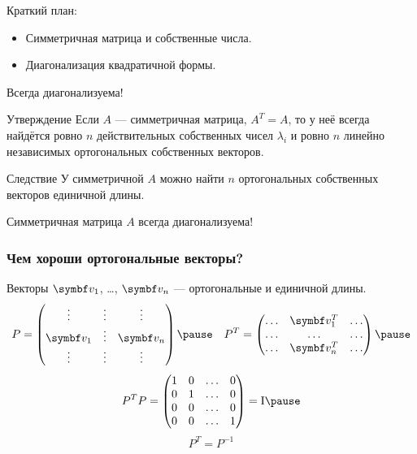 
\begin{frame} %


\end{frame}



\begin{frame}{Краткий план:}
  \begin{itemize}[<+->]
    \item Симметричная матрица и собственные числа.
    \item Диагонализация квадратичной формы.
  \end{itemize}

\end{frame}


\begin{frame}{Всегда диагонализуема!}
    \begin{block}{Утверждение}
        Если $A$ — симметричная матрица, $A^T = A$, то у неё всегда найдётся
        ровно $n$ \alert{действительных} собственных чисел $\lambda_i$ \pause 
        и ровно $n$ линейно независимых \alert{ортогональных} собственных векторов.
    \end{block}
    \pause
    \begin{block}{Следствие}
        У симметричной $A$ можно найти $n$ ортогональных собственных векторов единичной длины.

        Симметричная матрица $A$ всегда диагонализуема!
    \end{block}
\end{frame}    


\begin{frame}
    \frametitle{Чем хороши ортогональные векторы?}

    Векторы $\bv_1$, \ldots, $\bv_n$ — ортогональные и единичной длины.
    \[
    P = \begin{pmatrix}
        \vdots & \vdots & \vdots \\
        \bv_1 & \vdots & \bv_n \\
        \vdots & \vdots & \vdots \\
    \end{pmatrix}    \pause \quad
    P^T = \begin{pmatrix}
        \ldots & \bv_1^T & \ldots \\
    \ldots & \ldots & \ldots \\
    \ldots & \bv_n^T & \ldots \\
    \end{pmatrix}    \pause
    \]
%
    \[
    P^T P = \begin{pmatrix}        
        1 & 0 & \ldots & 0 \\
        0 & 1 & \ldots & 0 \\
        0 & 0 & \ldots & 0 \\
        0 & 0 & \ldots & 1 \\
    \end{pmatrix}  = \Id   \pause
    \]
%
    \[
    P^T = P^{-1}    
    \]
    
\end{frame}

